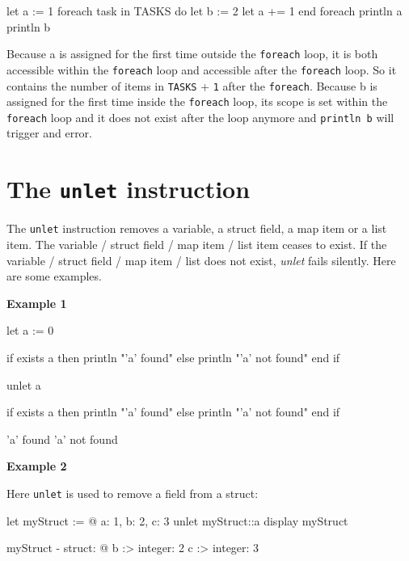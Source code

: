 \documentclass[10pt,openright,twosides]{report}
\newcommand{\gtlinline}[1]{\colorbox{light-blue}{\lstinline[language=gtl]{#1}}}
\newcommand{\examplen}[1]{\vspace{.75em}\noindent\textbf{Example #1}\vspace{0em}}
\begin{document}
\begin{gtl}
let a := 1
foreach task in TASKS do
  let b := 2
  let a += 1
end foreach
println a
println b
\end{gtl}

Because a is assigned for the first time outside the \gtlinline{foreach} loop, it is both accessible within the \gtlinline{foreach} loop and accessible after the \gtlinline{foreach} loop. So it contains the number of items in \gtlinline{TASKS} + \gtlinline{1} after the \gtlinline{foreach}. Because b is assigned for the first time inside the \gtlinline{foreach} loop, its scope is set within the \gtlinline{foreach} loop and it does not exist after the loop anymore and \gtlinline{println b} will trigger and error.


\section{The \texttt{unlet} instruction}

The \gtlinline{unlet} instruction removes a variable, a struct field, a map item or a list item. The variable / struct field / map item / list item ceases to exist. If the variable / struct field / map item / list does not exist, {\em unlet} fails silently. Here are some examples.

\examplen{1}
\begin{gtl}
let a := 0

if exists a then
  println "'a' found"
else
  println "'a' not found"
end if

unlet a

if exists a then
  println "'a' found"
else
  println "'a' not found"
end if
\end{gtl}

\begin{console}
'a' found
'a' not found
\end{console}


\examplen{2}

\noindent Here \gtlinline{unlet} is used to remove a field from a struct:

\begin{gtl}
let myStruct := @{ a: 1, b: 2, c: 3 }
unlet myStruct::a
display myStruct
\end{gtl} 

\begin{console}
myStruct - struct: @{
    b :>
        integer: 2
    c :>
        integer: 3
}
\end{console}
\end{document}
